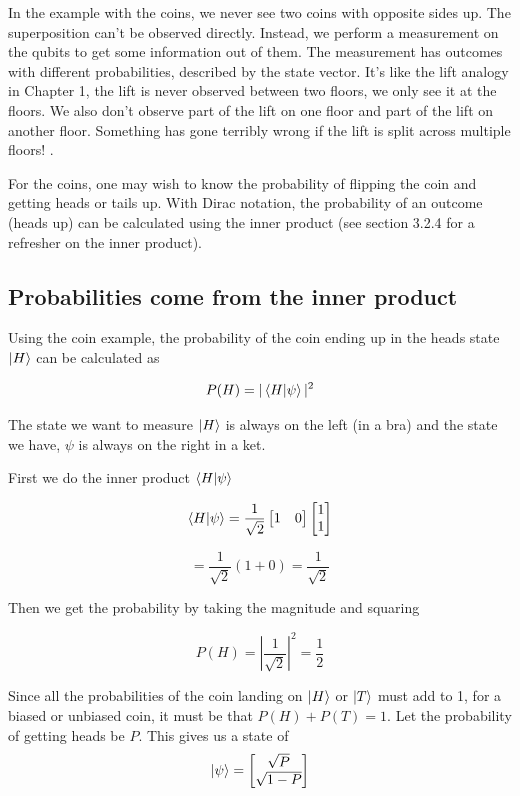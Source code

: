 \documentclass{book}
\begin{document}
In the example with the coins, we never see two coins with opposite sides up. The superposition can't be observed directly. Instead, we perform a measurement on the qubits to get some information out of them. The measurement has outcomes with different probabilities, described by the state vector. It's like the lift analogy in Chapter 1, the lift is never observed between two floors, we only see it at the floors. We also don't observe part of the lift on one floor and part of the lift on another floor. Something has gone terribly wrong if the lift is split across multiple floors! 
. 

For the coins, one may wish to know the probability of flipping the coin and getting heads or tails up. With Dirac notation, the probability of an outcome (heads up) can be calculated using the inner product (see section 3.2.4 for a refresher on the inner product).

\subsection{ Probabilities come from the inner product}

Using the coin example, the probability of the coin ending up in the heads state $\ket{H}$ can be calculated as

$$ P(H) = |\braket{H|\psi}|^2  $$

The state we want to measure $\ket{H}$ is always on the left (in a bra) and the state we have, $\psi$ is always on the right in a ket.

First we do the inner product $\braket{H|\psi}$

$$
\braket{H|\psi} = \frac{1}{\sqrt{2}}\begin{bmatrix} 1 & 0 \end{bmatrix} \begin{bmatrix} 1 \\ 1 \end{bmatrix}
$$

$$ = \frac{1}{\sqrt{2}} (1 + 0 ) = \frac{1}{\sqrt{2}}$$

Then we get the probability by taking the magnitude and squaring 

$$ P(H) = \left| \frac{1}{\sqrt{2}} \right|^2 = \frac{1}{2} $$

Since all the probabilities of the coin landing on $\ket{H}$ or $\ket{T}$ must add to 1, for a biased or unbiased coin, it must be that $P(H) + P(T) = 1$. Let the probability of getting heads be $P$. This gives us a state of 
$$
\ket{\psi} = \begin{bmatrix} \sqrt{P} \\ \sqrt{1-P} \end{bmatrix}
$$
\end{document}
